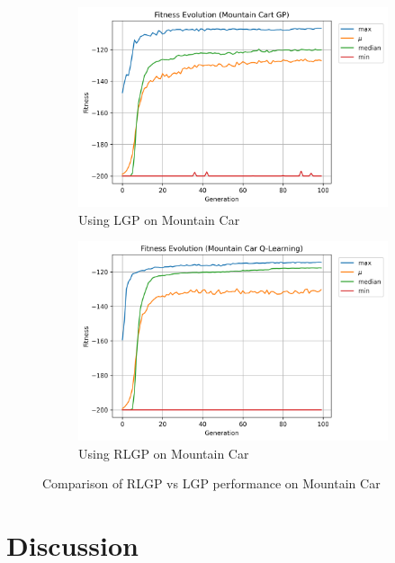 \documentclass[12pt, final]{dalcsthesis}
\begin{document}
\begin{figure}[hb]
	\centering
	\begin{subfigure}{1.0\textwidth}
		\includegraphics[width=\linewidth]{mountain_car_lgp.png}
		\caption{Using LGP on Mountain Car}
		\label{fig:mountain-car-lgp}
	\end{subfigure}
	\hfill
	\begin{subfigure}{1.0\textwidth}
		\includegraphics[width=\linewidth]{mountain_car_q.png}
		\caption{Using RLGP on Mountain Car}
		\label{fig:mountain-car-q}
	\end{subfigure}
	\caption{Comparison of RLGP vs LGP performance on Mountain Car}
	\label{fig:mountain-car-comparison}
\end{figure}


\section{Discussion}
\end{document}

